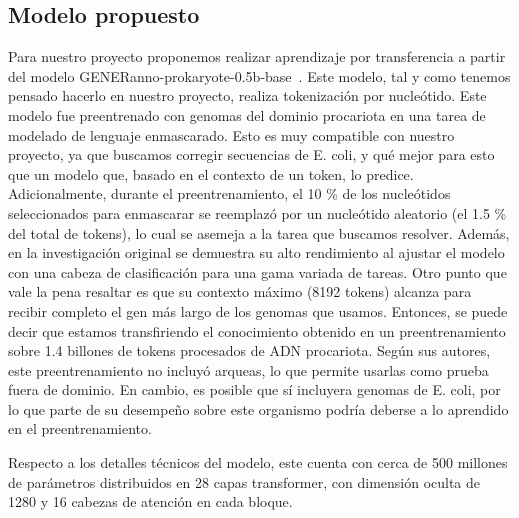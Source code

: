 \documentclass[sigconf,nonacm]{acmart}
\begin{document}
\begin{enumerate}
\end{enumerate}

\subsection{Modelo propuesto}\label{sec:modelo}

Para nuestro proyecto proponemos realizar aprendizaje por transferencia a partir del modelo GENERanno-prokaryote-0.5b-base~\cite{li2025generanno}. Este modelo, tal y como tenemos pensado hacerlo en nuestro proyecto, realiza tokenización por nucleótido. Este modelo fue preentrenado con genomas del dominio procariota en una tarea de modelado de lenguaje enmascarado. Esto es muy compatible con nuestro proyecto, ya que buscamos corregir secuencias de E. coli, y qué mejor para esto que un modelo que, basado en el contexto de un token, lo predice. Adicionalmente, durante el preentrenamiento, el 10 \% de los nucleótidos seleccionados para enmascarar se reemplazó por un nucleótido aleatorio (el 1.5 \% del total de tokens), lo cual se asemeja a la tarea que buscamos resolver. Además, en la investigación original se demuestra su alto rendimiento al ajustar el modelo con una cabeza de clasificación para una gama variada de tareas. Otro punto que vale la pena resaltar es que su contexto máximo (8192 tokens) alcanza para recibir completo el gen más largo de los genomas que usamos. Entonces, se puede decir que estamos transfiriendo el conocimiento obtenido en un preentrenamiento sobre 1.4 billones de tokens procesados de ADN procariota. Según sus autores, este preentrenamiento no incluyó arqueas, lo que permite usarlas como prueba fuera de dominio. En cambio, es posible que sí incluyera genomas de E. coli, por lo que parte de su desempeño sobre este organismo podría deberse a lo aprendido en el preentrenamiento.

Respecto a los detalles técnicos del modelo, este cuenta con cerca de 500 millones de parámetros distribuidos en 28 capas transformer, con dimensión oculta de 1280 y 16 cabezas de atención en cada bloque.
\end{document}
